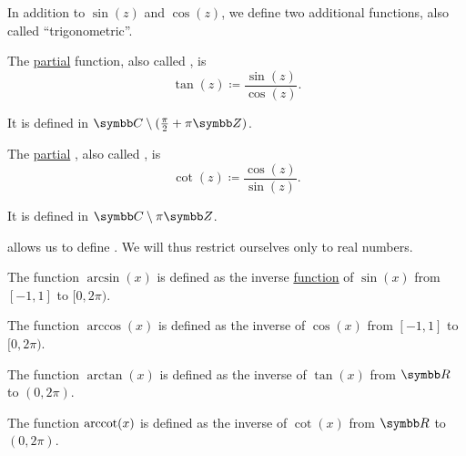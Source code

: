 \begin{definition}\label{def:derived_trigonometric_functions}
  In addition to \( \sin(z) \) and \( \cos(z) \), we define two additional functions, also called \enquote{trigonometric}.

  \begin{defenum}
     The \hyperref[def:function/partial]{partial}  function, also called , is
    \begin{equation*}
      \tan(z) \coloneqq \frac {\sin(z)} {\cos(z)}.
    \end{equation*}

    It is defined in \( \BC \setminus (\tfrac \pi 2 + \pi\BZ) \).

     The \hyperref[def:function/partial]{partial} , also called , is
    \begin{equation*}
      \cot(z) \coloneqq \frac {\cos(z)} {\sin(z)}.
    \end{equation*}

    It is defined in \( \BC \setminus \pi\BZ \).
  \end{defenum}
\end{definition}

\begin{definition}\label{def:inverse_trigonometric_functions}
   allows us to define . We will thus restrict ourselves only to real numbers.

  \begin{defenum}
     The  function \( \arcsin(x) \) is defined as the inverse \hyperref[def:function/inverse]{function} of \( \sin(x) \) from \( [-1, 1] \) to \( [0, 2\pi) \).

     The  function \( \arccos(x) \) is defined as the inverse of \( \cos(x) \) from \( [-1, 1] \) to \( [0, 2\pi) \).

     The  function \( \arctan(x) \) is defined as the inverse of \( \tan(x) \) from \( \BR \) to \( (0, 2\pi) \).

     The  function \( \operatorname{arccot}(x) \) is defined as the inverse of \( \cot(x) \) from \( \BR \) to \( (0, 2\pi) \).
  \end{defenum}
\end{definition}

